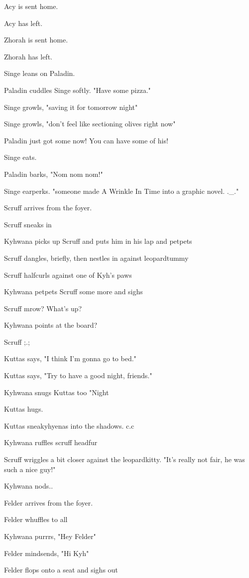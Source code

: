 Acy is sent home.

Acy has left.

Zhorah is sent home.

Zhorah has left.

Singe leans on Paladin.

Paladin cuddles Singe softly. "Have some pizza."

Singe growls, "saving it for tomorrow night"

Singe growls, "don't feel like sectioning olives right now"

Paladin just got some now! You can have some of his!

Singe eats.

Paladin barks, "Nom nom nom!"

Singe earperks. "someone made A Wrinkle In Time into a graphic novel. .\_."

Scruff arrives from the foyer.

Scruff sneaks in

Kyhwana picks up Scruff and puts him in his lap and petpets

Scruff dangles, briefly, then nestles in against leopardtummy

Scruff halfcurls against one of Kyh's paws

Kyhwana petpets Scruff some more and sighs

Scruff mrow? What's up?

Kyhwana points at the board?

Scruff ;.;

Kuttas says, "I think I'm gonna go to bed."

Kuttas says, "Try to have a good night, friends."

Kyhwana snugs Kuttas too "Night

Kuttas hugs.

Kuttas sneakyhyenas into the shadows. c.c

Kyhwana ruffles scruff headfur

Scruff wriggles a bit closer against the leopardkitty. "It's really not fair, he was such a nice guy!"

Kyhwana nods..

Felder arrives from the foyer.

Felder whuffles to all

Kyhwana purrrs, "Hey Felder"

Felder mindsends, "Hi Kyh"

Felder flops onto a seat and sighs out

